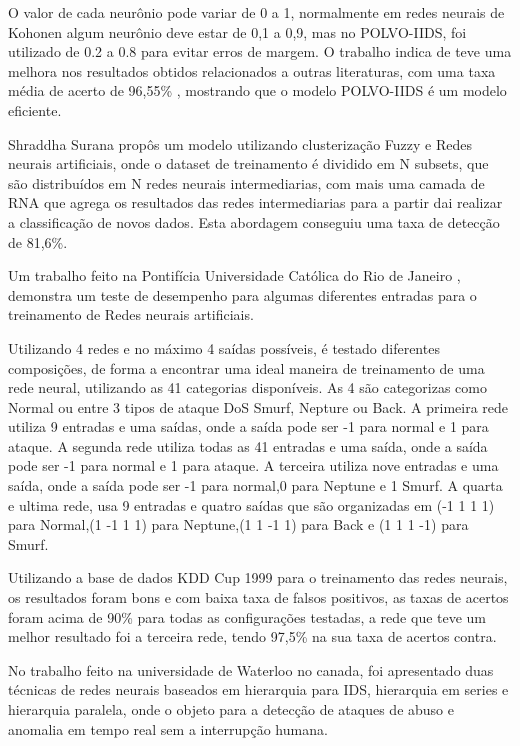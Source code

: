 O valor de cada neurônio pode variar de 0 a 1, normalmente em redes neurais de Kohonen algum neurônio deve estar de 0,1 a 0,9, mas no POLVO-IIDS, foi utilizado de 0.2 a 0.8 para evitar erros de margem. 
O trabalho indica de teve uma melhora nos resultados obtidos relacionados a outras literaturas, com uma taxa média de acerto de 96,55\% , mostrando que o modelo POLVO-IIDS é um modelo eficiente.

Shraddha Surana propôs um modelo \cite{Surana} utilizando clusterização Fuzzy e Redes neurais artificiais, onde o dataset de treinamento é dividido em N subsets, que são distribuídos em N redes neurais intermediarias, com mais uma camada de RNA que agrega os resultados das redes intermediarias para a partir dai realizar a classificação de novos dados. Esta abordagem conseguiu uma taxa de detecção de 81,6\%.



Um trabalho feito na Pontifícia Universidade Católica do Rio de Janeiro \cite{RenatoMaia}, demonstra um teste de desempenho para algumas diferentes entradas para o treinamento de Redes neurais artificiais.

Utilizando 4 redes e no máximo 4 saídas possíveis, é testado diferentes composições, de forma a encontrar uma ideal maneira de treinamento de uma rede neural, utilizando as 41 categorias disponíveis.
As 4 são categorizas como Normal ou entre 3 tipos de ataque DoS Smurf, Nepture ou Back.
A primeira rede utiliza 9 entradas e uma saídas, onde a saída pode ser -1 para normal e 1 para ataque.
A segunda rede utiliza todas as 41 entradas e uma saída, onde a saída pode ser -1 para normal e 1 para ataque.
A terceira utiliza nove entradas e uma saída, onde a saída pode ser -1 para normal,0 para Neptune e 1 Smurf.
A quarta e ultima rede, usa 9 entradas e quatro saídas que são organizadas em (-1 1 1 1) para Normal,(1 -1 1 1) para Neptune,(1 1 -1 1) para Back e (1 1 1 -1) para Smurf.

Utilizando a base de dados KDD Cup 1999 para o treinamento das redes neurais, os resultados foram bons e com baixa taxa de falsos positivos, as taxas de acertos foram acima de 90\% para todas as configurações testadas, a rede que teve um melhor resultado foi a terceira rede, tendo 97,5\% na sua taxa de acertos contra.

No trabalho feito na universidade de Waterloo no canada\cite{Chunlin}, foi apresentado duas técnicas de redes neurais baseados em hierarquia para IDS, hierarquia em series e hierarquia paralela, onde o objeto para a detecção de ataques de abuso e anomalia em tempo real sem a interrupção humana.

